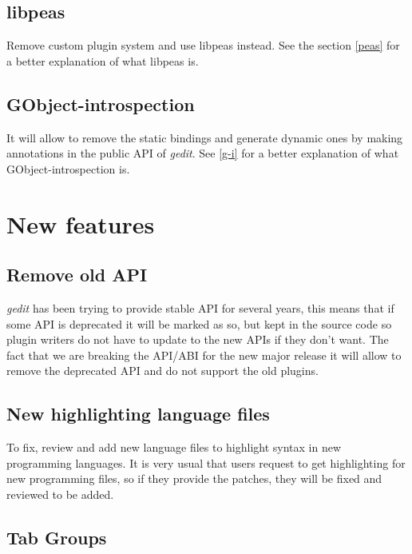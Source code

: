 \subsection{libpeas}\label{libpeas}

Remove custom plugin system and use libpeas instead. See the section \ref{peas} for a better explanation of what libpeas is.

\subsection{GObject-introspection}\label{GObjectIntrospection}

It will allow to remove the static bindings and generate dynamic ones by making annotations in the public API of \emph{gedit}. See \ref{g-i} for a better explanation of what GObject-introspection is.

\section{New features}\label{NewFeatures}

\subsection{Remove old API}\label{RemoveOldAPI}

\emph{gedit} has been trying to provide stable API for several years, this means that if some API is deprecated it will be marked as so, but kept in the source code so plugin writers do not have to update to the new APIs if they don't want. The fact that we are breaking the API/ABI for the new major release it will allow to remove the deprecated API and do not support the old plugins.

\subsection{New highlighting language files}\label{HighFiles}

To fix, review and add new language files to highlight syntax in new programming languages. It is very usual that users request to get highlighting for new programming files, so if they provide the patches, they will be fixed and reviewed to be added.

\subsection{Tab Groups}\label{TabGroups}

